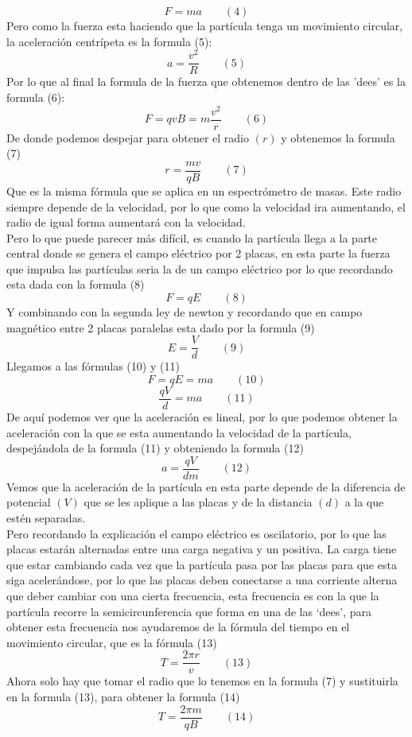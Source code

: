 \documentclass[12pt]{article}
\begin{document}
			$$ F = ma \qquad (4) $$
			Pero como la fuerza esta haciendo que la partícula tenga un movimiento circular, la aceleración centrípeta es la formula (5):
			$$ a = \frac{v^2}{R} \qquad (5) $$
			Por lo que al final la formula de la fuerza que obtenemos dentro de las 'dees' es la formula (6):
			$$ F = qvB = m\frac{v^2}{r} \qquad (6)  $$
			De donde podemos despejar para obtener el radio $ (r) $ y obtenemos la formula (7)
			$$ r = \frac{mv}{qB} \qquad (7)  $$
			Que es la misma fórmula que se aplica en un espectrómetro de masas. Este radio siempre depende de la velocidad, por 
			lo que como la velocidad ira aumentando, el radio de igual forma aumentará con la velocidad.\\
			Pero lo que puede parecer más difícil, es cuando la partícula llega a la parte central donde se genera el campo eléctrico 
			por 2 placas, en esta parte la fuerza que impulsa las partículas seria la de un campo eléctrico por lo que recordando esta 
			dada con la formula (8)
			$$ F = qE \qquad (8) $$
			Y combinando con la segunda ley de newton y recordando que en campo magnético entre 2 placas paralelas esta dado por 
			la formula (9)
			$$ E = \frac{V}{d} \qquad (9) $$
			Llegamos a las fórmulas (10) y (11)
			$$ F = qE = ma \qquad (10) $$
			$$ \frac{qV}{d} = ma \qquad (11) $$
			De aquí podemos ver que la aceleración es lineal, por lo que podemos obtener la aceleración con la que se esta aumentando 
			la velocidad de la partícula, despejándola de la formula (11) y obteniendo la formula (12)
			$$ a = \frac{qV}{dm} \qquad (12) $$
			Vemos que la aceleración de la partícula en esta parte depende de la diferencia de potencial $ (V) $ que se les aplique a las placas y de la 
			distancia $ (d) $ a la que estén separadas. \\
			Pero recordando la explicación el campo eléctrico es oscilatorio, por lo que las placas estarán alternadas entre una carga 
			negativa y un positiva. La carga tiene que estar cambiando cada vez que la partícula pasa por las placas para que esta siga 
			acelerándose, por lo que las placas deben conectarse a una corriente alterna que deber cambiar con una cierta frecuencia, 
			esta frecuencia es con la que la partícula recorre la semicircunferencia que forma en una de las ‘dees’, para obtener esta 
			frecuencia nos ayudaremos de la fórmula del tiempo en el movimiento circular, que es la fórmula (13)
			$$ T = \frac{2\pi r}{v} \qquad (13) $$
			Ahora solo hay que tomar el radio que lo tenemos en la formula (7) y sustituirla en la formula (13), para obtener la formula (14)
			$$ T = \frac{2\pi m}{qB} \qquad (14) $$
\end{document}
